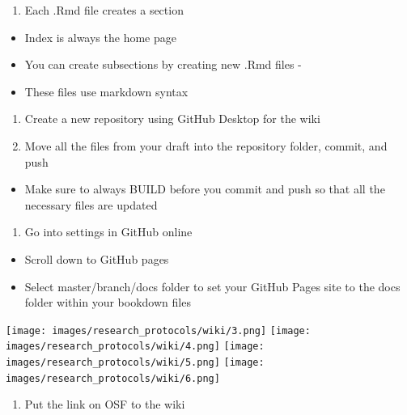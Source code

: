 \documentclass[
]{book}
\providecommand{\tightlist}{%
  \setlength{\itemsep}{0pt}\setlength{\parskip}{0pt}}
\begin{document}
\begin{enumerate}
\def\labelenumi{\arabic{enumi}.}
\setcounter{enumi}{2}
\tightlist
\item
  Each .Rmd file creates a section
\end{enumerate}

\begin{itemize}
\tightlist
\item
  Index is always the home page
\item
  You can create subsections by creating new .Rmd files -
\item
  These files use markdown syntax
\end{itemize}

\begin{enumerate}
\def\labelenumi{\arabic{enumi}.}
\setcounter{enumi}{3}
\item
  Create a new repository using GitHub Desktop for the wiki
\item
  Move all the files from your draft into the repository folder, commit, and push
\end{enumerate}

\begin{itemize}
\tightlist
\item
  Make sure to always BUILD before you commit and push so that all the necessary files are updated
\end{itemize}

\begin{enumerate}
\def\labelenumi{\arabic{enumi}.}
\setcounter{enumi}{5}
\tightlist
\item
  Go into settings in GitHub online
\end{enumerate}

\begin{itemize}
\tightlist
\item
  Scroll down to GitHub pages
\item
  Select master/branch/docs folder to set your GitHub Pages site to the docs folder within your bookdown files
\end{itemize}

\texttt{[image: images/research\_protocols/wiki/3.png]}
\texttt{[image: images/research\_protocols/wiki/4.png]}
\texttt{[image: images/research\_protocols/wiki/5.png]}
\texttt{[image: images/research\_protocols/wiki/6.png]}

\begin{enumerate}
\def\labelenumi{\arabic{enumi}.}
\setcounter{enumi}{6}
\tightlist
\item
  Put the link on OSF to the wiki
\end{enumerate}
\end{document}
